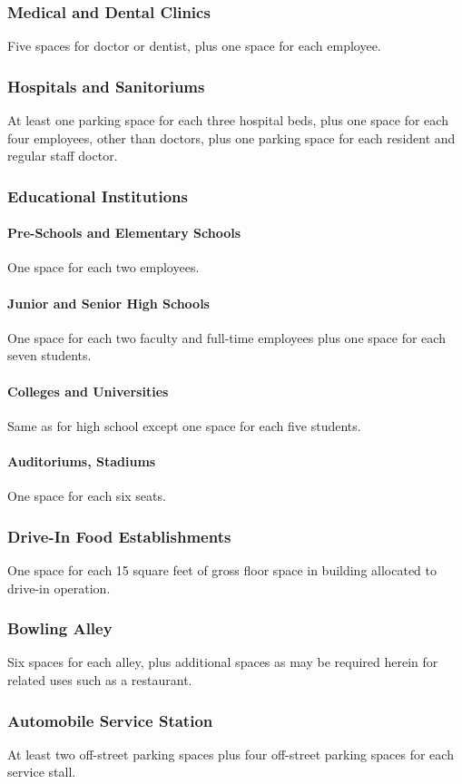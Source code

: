 \subsubsection{Medical and Dental Clinics}
Five spaces for doctor or dentist, plus one space for each employee.
\subsubsection{Hospitals and Sanitoriums}
At least one parking space for each three hospital beds, plus one space for each four employees, other than doctors, plus one parking space for each resident and regular staff doctor.
\subsubsection{Educational Institutions}
\paragraph{Pre-Schools and Elementary Schools}
One space for each two employees.
\paragraph{Junior and Senior High Schools}
One space for each two faculty and full-time employees plus one space for each seven students.
\paragraph{Colleges and Universities}
Same as for high school except one space for each five students.
\paragraph{Auditoriums, Stadiums}
One space for each six seats.
\subsubsection{Drive-In Food Establishments}
One space for each 15 square feet of gross floor space in building allocated to drive-in operation.
\subsubsection{Bowling Alley}
Six spaces for each alley, plus additional spaces as may be required herein for related uses such as a restaurant.
\subsubsection{Automobile Service Station}
At least two off-street parking spaces plus four off-street parking spaces for each service stall.
